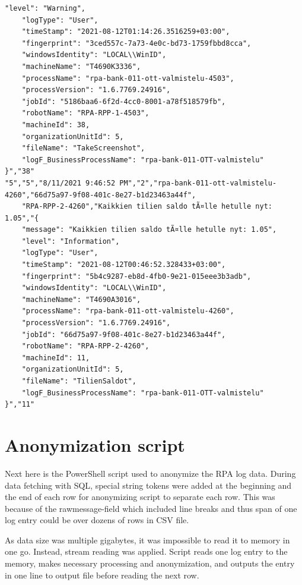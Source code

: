 \begin{Verbatim}[fontsize=\tiny]
    "level": "Warning",
    "logType": "User",
    "timeStamp": "2021-08-12T01:14:26.3516259+03:00",
    "fingerprint": "3ced557c-7a73-4e0c-bd73-1759fbbd8cca",
    "windowsIdentity": "LOCAL\\WinID",
    "machineName": "T4690K3336",
    "processName": "rpa-bank-011-ott-valmistelu-4503",
    "processVersion": "1.6.7769.24916",
    "jobId": "5186baa6-6f2d-4cc0-8001-a78f518579fb",
    "robotName": "RPA-RPP-1-4503",
    "machineId": 38,
    "organizationUnitId": 5,
    "fileName": "TakeScreenshot",
    "logF_BusinessProcessName": "rpa-bank-011-OTT-valmistelu"
}","38"
"5","5","8/11/2021 9:46:52 PM","2","rpa-bank-011-ott-valmistelu-4260","66d75a97-9f08-401c-8e27-b1d23463a44f",
    "RPA-RPP-2-4260","Kaikkien tilien saldo tÃ¤lle hetulle nyt: 1.05","{
    "message": "Kaikkien tilien saldo tÃ¤lle hetulle nyt: 1.05",
    "level": "Information",
    "logType": "User",
    "timeStamp": "2021-08-12T00:46:52.328433+03:00",
    "fingerprint": "5b4c9287-eb8d-4fb0-9e21-015eee3b3adb",
    "windowsIdentity": "LOCAL\\WinID",
    "machineName": "T4690A3016",
    "processName": "rpa-bank-011-ott-valmistelu-4260",
    "processVersion": "1.6.7769.24916",
    "jobId": "66d75a97-9f08-401c-8e27-b1d23463a44f",
    "robotName": "RPA-RPP-2-4260",
    "machineId": 11,
    "organizationUnitId": 5,
    "fileName": "TilienSaldot",
    "logF_BusinessProcessName": "rpa-bank-011-OTT-valmistelu"
}","11"

\end{Verbatim}

\clearpage



\section{Anonymization script}\label{sec:app-anonymization-script}

Next here is the PowerShell script used
to anonymize the RPA log data.
During data fetching with SQL,
special string tokens were added at the beginning and the end of each row
for anonymizing script to separate each row.
This was because of the rawmessage-field
which included line breaks
and thus span of one log entry could be over dozens of rows in CSV file.

As data size was multiple gigabytes,
it was impossible to read it to memory in one go.
Instead,
stream reading was applied.
Script reads one log entry to the memory,
makes necessary processing and anonymization,
and outputs the entry in one line to output file
before reading the next row.


